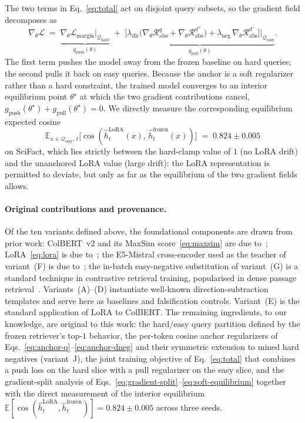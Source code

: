 The two terms in Eq.~\eqref{eq:total} act on disjoint query subsets, so the gradient field decomposes as
\begin{equation}
\nabla_\theta\mathcal{L}
\;=\;
\underbrace{\nabla_\theta\mathcal{L}_{\text{margin}}\big|_{\mathcal{Q}_{\text{hard}}}}_{g_{\text{push}}(\theta)}
\;+\;
\underbrace{\bigl[\lambda_{\text{dir}}\bigl(\nabla_\theta\mathcal{R}_{\text{abs}}^{q} + \nabla_\theta\mathcal{R}_{\text{abs}}^{d^+}\bigr) + \lambda_{\text{neg}}\,\nabla_\theta\mathcal{R}_{\text{abs}}^{d^-}\bigr]\big|_{\mathcal{Q}_{\text{easy}}}}_{g_{\text{pull}}(\theta)}.
\label{eq:gradient-split}
\end{equation}
The first term pushes the model away from the frozen baseline on hard queries; the second pulls it back on easy queries. Because the anchor is a soft regularizer rather than a hard constraint, the trained model converges to an interior equilibrium point $\theta^{\star}$ at which the two gradient contributions cancel, $g_{\text{push}}(\theta^{\star}) + g_{\text{pull}}(\theta^{\star}) = 0$. We directly measure the corresponding equilibrium expected cosine
\begin{equation}
\mathbb{E}_{x\in\mathcal{Q}_{\text{easy}},\,t}\bigl[\cos(\hat h_t^{\text{LoRA}}(x),\, \hat h_t^{\text{frozen}}(x))\bigr] \;=\; 0.824 \pm 0.005
\label{eq:soft-equilibrium}
\end{equation}
on SciFact, which lies strictly between the hard-clamp value of $1$ (no LoRA drift) and the unanchored LoRA value (large drift): the LoRA representation is permitted to deviate, but only as far as the equilibrium of the two gradient fields allows.

\paragraph{Original contributions and provenance.}
Of the ten variants defined above, the foundational components are drawn from prior work: ColBERT~v2 and its MaxSim score~\eqref{eq:maxsim} are due to~\cite{santhanam2022colbertv2}; LoRA~\eqref{eq:lora} is due to~\cite{hu2021lora}; the E5-Mistral cross-encoder used as the teacher of variant~(F) is due to~\cite{wang2024e5mistral}; the in-batch easy-negative substitution of variant~(G) is a standard technique in contrastive retrieval training, popularised in dense passage retrieval~\cite{karpukhin2020dpr}. Variants~(A)--(D) instantiate well-known direction-subtraction templates and serve here as baselines and falsification controls. Variant~(E) is the standard application of LoRA to ColBERT. The remaining ingredients, to our knowledge, are original to this work: the hard/easy query partition defined by the frozen retriever's top-$1$ behavior, the per-token cosine anchor regularizers of Eqs.~\eqref{eq:anchor-q}--\eqref{eq:anchor-dneg} and their symmetric extension to mined hard negatives (variant~J), the joint training objective of Eq.~\eqref{eq:total} that combines a push loss on the hard slice with a pull regularizer on the easy slice, and the gradient-split analysis of Eqs.~\eqref{eq:gradient-split}--\eqref{eq:soft-equilibrium} together with the direct measurement of the interior equilibrium $\mathbb{E}[\cos(\hat h_t^{\text{LoRA}}, \hat h_t^{\text{frozen}})] = 0.824 \pm 0.005$ across three seeds.